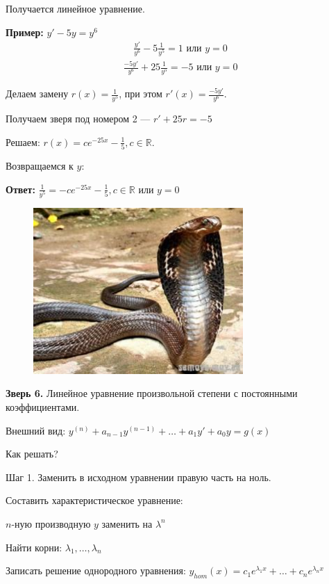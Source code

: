 \documentclass[10pt, a4paper]{article}
\begin{document}
\par Получается линейное уравнение.
\par \textbf{Пример:} $y' - 5y = y^6$
\begin{eqnarray*}
\frac{y'}{y^6} - 5 \frac{1}{y^5} = 1 \text{ или } y = 0
\end{eqnarray*}
\begin{eqnarray*}
\frac{-5y'}{y^6} + 25 \frac{1}{y^5} = -5 \text{ или } y = 0
\end{eqnarray*}
\par Делаем замену $r(x) = \frac1 {y^5}$, при этом $r'(x) = \frac{-5y'}{y^6}$.
\par Получаем зверя под номером 2 --- $r' + 25r = -5$
\par Решаем: $r(x) = ce^{-25x} - \frac 1 5, c \in \mathbb{R}$.
\par Возвращаемся к $y$:
\par \textbf{Ответ:} $\frac 1 {y^5} = -ce^{-25x} - \frac 1 5, c \in \mathbb{R} \text{ или } y = 0$ \\
\newpage
\pagecolor{LimeGreen}
\begin{figure}[h]
\centering
\includegraphics[width = 8cm]{snake.jpg}
\end{figure}
\par \textbf{Зверь 6.} Линейное уравнение произвольной степени с постоянными коэффициентами.
\par Внешний вид: $y^{(n)} + a_{n-1}y^{(n-1)} + \dots + a_1y' + a_0y = g(x)$
\par Как решать?
\par Шаг 1. Заменить в исходном уравнении правую часть на ноль.
\par Составить характеристическое уравнение:
\par $n$-ную производную $y$ заменить на $\lambda^n$
\par Найти корни: $\lambda_1, \dots, \lambda_n$
\par Записать решение однородного уравнения: $y_{hom}(x) = c_1e^{\lambda_1x} + \dots + c_ne^{\lambda_nx}$
\end{document}
